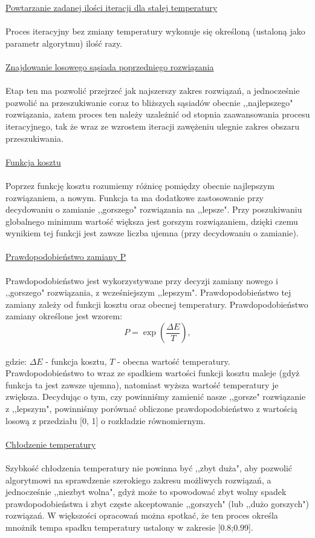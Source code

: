 \documentclass[twoside]{projektInzynierskiMS1}
\newcommand{\newLine}{~\\}
\newcommand{\si}{ś}
\begin{document}
\noindent \underline{Powtarzanie zadanej ilo\si ci iteracji dla stałej temperatury} \\ \newLine
\indent Proces iteracyjny bez zmiany temperatury wykonuje się okre\si loną (ustaloną jako parametr algorytmu) ilo\si ć razy. \\ \newLine
\newpage
\noindent \underline{Znajdowanie losowego sąsiada poprzedniego rozwiązania} \\ \newLine
\indent Etap ten ma pozwolić przejrzeć jak najszerszy zakres rozwiązań, a jednocze\si nie pozwolić na przeszukiwanie coraz to bliższych sąsiadów obecnie ,,najlepszego" rozwiązania, zatem proces ten należy uzależnić od stopnia zaawansowania procesu iteracyjnego, tak że wraz ze wzrostem iteracji zawężeniu ulegnie zakres obszaru przeszukiwania.\\ \newLine

\noindent \underline{Funkcja kosztu} \\ \newLine
\indent Poprzez funkcję kosztu rozumiemy różnicę pomiędzy obecnie najlepszym rozwiązaniem, a nowym. Funkcja ta ma dodatkowe zastosowanie przy decydowaniu o zamianie ,,gorszego" rozwiązania na ,,lepsze". Przy poszukiwaniu globalnego minimum warto\si ć większa jest gorszym rozwiązaniem, dzięki czemu wynikiem tej funkcji jest zawsze liczba ujemna (przy decydowaniu o zamianie). \\ \newLine


\noindent \underline{Prawdopodobieństwo zamiany P} \\ \newLine
\indent Prawdopodobieństwo jest wykorzystywane przy decyzji zamiany nowego i ,,gorszego" rozwiązania, z wcze\si niejszym ,,lepszym". Prawdopodobieństwo tej zamiany zależy od funkcji kosztu oraz obecnej temperatury. Prawdopodobieństwo zamiany okre\si lone jest wzorem:
$$ P = \exp\left(\frac{\Delta E}{T}\right),  $$ \\

gdzie: $ \Delta E$  - funkcja kosztu, $T$ - obecna warto\si ć temperatury.\\

Prawdopodobieństwo to wraz ze spadkiem warto\si ci funkcji kosztu maleje (gdyż funkcja ta jest zawsze ujemna), natomiast wyższa warto\si ć temperatury je zwiększa. Decydując o tym, czy powinniśmy zamienić nasze ,,gorsze" rozwiązanie z ,,lepszym", powinniśmy porównać obliczone prawdopodobieństwo z wartością losową z przedziału [0, 1] o rozkładzie równomiernym.\\ \newLine


\noindent \underline{Chłodzenie temperatury} \\ \newLine
\indent Szybkość chłodzenia temperatury nie powinna być ,,zbyt duża", aby pozwolić algorytmowi na sprawdzenie szerokiego zakresu możliwych rozwiązań, a jednocześnie ,,niezbyt wolna", gdyż może to spowodować zbyt wolny spadek prawdopodobieństwa i zbyt częste akceptowanie ,,gorszych" (lub ,,dużo gorszych") rozwiązań. W większości opracowań można spotkać, że ten proces okre\si la mnożnik tempa spadku temperatury ustalony w zakresie [0.8;0.99].\\ \newLine
		
\end{document}
